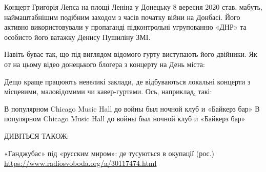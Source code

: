 Концерт Григорія Лепса на площі Леніна у Донецьку 8 вересня 2020 став,
мабуть, наймаштабнішим подібним заходом з часів початку війни на Донбасі.
Його активно використовували у пропаганді підконтрольні угрупованню «ДНР»
та особисто його ватажку Денису Пушиліну ЗМІ.

Навіть буває так, що під виглядом відомого гурту виступають його двійники.
Як от на цьому відео донецького блогера з концерту на День міста:

Дещо краще працюють невеликі заклади, де відбуваються локальні концерти з
місцевими, маловідомими чи кавер-гуртами. Ось, наприклад, такі:

В популярном Chicago Music Hall до войны был ночной клуб и «Байкерз бар» В
популярном Chicago Music Hall до войны был ночной клуб и «Байкерз бар»

ДИВІТЬСЯ ТАКОЖ:

«Ганджубас» під «русским миром»: де тусуються в окупації (рос.)
\url{https://www.radiosvoboda.org/a/30117474.html}

